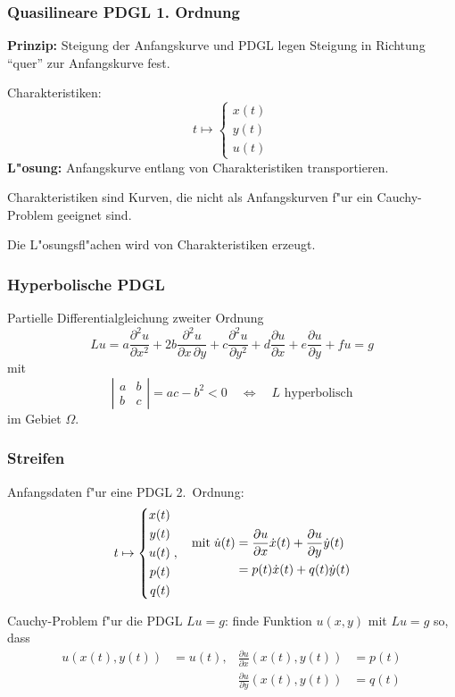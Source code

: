 \begin{frame}
\frametitle{Quasilineare PDGL 1. Ordnung}

{\bf Prinzip:} Steigung der Anfangskurve und PDGL legen Steigung in Richtung
``quer'' zur Anfangskurve fest.
\pause
\bigskip

Charakteristiken:
\[
t\mapsto \left\{\begin{aligned}
x(t)\\
y(t)\\
u(t)
\end{aligned}\right.
\]
{\bf L"osung:} Anfangskurve entlang von Charakteristiken transportieren.
\pause

\begin{definition}
Charakteristiken sind Kurven, die {\color{red}nicht} als Anfangskurven f"ur ein
Cauchy-Problem geeignet sind.
\end{definition}

\begin{theorem}
Die L"osungsfl"achen wird von Charakteristiken erzeugt.
\end{theorem}

\end{frame}

\begin{frame}
\frametitle{Hyperbolische PDGL}
Partielle Differentialgleichung zweiter Ordnung
\[
Lu
=
a\frac{\partial^2 u}{\partial x^2}
+
2b \frac{\partial^2 u}{\partial x\,\partial y}
+
c\frac{\partial^2 u}{\partial y^2}
+
d\frac{\partial u}{\partial x}
+
e\frac{\partial u}{\partial y}
+
fu=g
\]
mit
\[
\left|\begin{matrix}
a&b\\b&c
\end{matrix}\right|
=ac-b^2 < 0
\quad\Leftrightarrow\quad
\text{$L$ hyperbolisch}
\]
im Gebiet $\Omega$.
\end{frame}

\begin{frame}
\frametitle{Streifen}

Anfangsdaten f"ur eine PDGL 2.~Ordnung:
\[
t\mapsto
\left\{
\begin{aligned}
x(t)\\
y(t)\\
u(t)\\
p(t)\\
q(t)
\end{aligned}
\right.
,
\quad
\begin{aligned}
\text{mit\;}
\dot u(t)
&=
\frac{\partial u}{\partial x}\dot x(t) + \frac{\partial u}{\partial y}\dot y(t)\\
&=p(t)\dot x(t)+q(t)\dot y(t)
\end{aligned}
\]

\begin{definition}
Cauchy-Problem f"ur die PDGL $Lu = g$: finde Funktion $u(x,y)$ mit $Lu=g$ so,
dass
\begin{align*}
u(x(t),y(t))&=u(t), &\frac{\partial u}{\partial x}(x(t),y(t))&=p(t)\\
            &       &\frac{\partial u}{\partial y}(x(t),y(t))&=q(t)
\end{align*}
\end{definition}

\end{frame}

